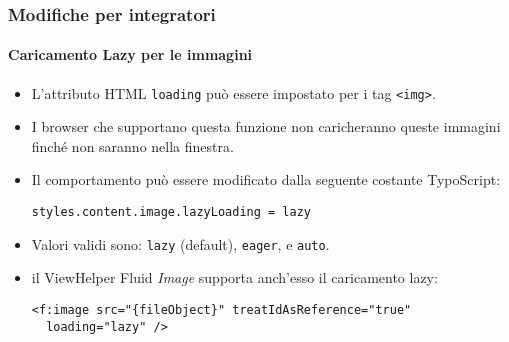 
\begin{frame}[fragile]
	\frametitle{Modifiche per integratori}
	\framesubtitle{Caricamento Lazy per le immagini}

	\lstset{basicstyle=\smaller\ttfamily}

	\begin{itemize}
		\item L'attributo HTML \texttt{loading} può essere impostato per i tag \texttt{<img>}.
		\item I browser che supportano questa funzione non caricheranno queste immagini finché non saranno nella finestra.
		\item Il comportamento può essere modificato dalla seguente costante TypoScript:

\vspace{-0.4cm}
\begin{lstlisting}
styles.content.image.lazyLoading = lazy
\end{lstlisting}

		\item Valori validi sono: \texttt{lazy} (default), \texttt{eager}, e \texttt{auto}.
		\item il ViewHelper Fluid \textit{Image} supporta anch'esso il caricamento lazy:

\vspace{-0.4cm}
\begin{lstlisting}
<f:image src="{fileObject}" treatIdAsReference="true"
  loading="lazy" />
\end{lstlisting}

	\end{itemize}

\end{frame}


